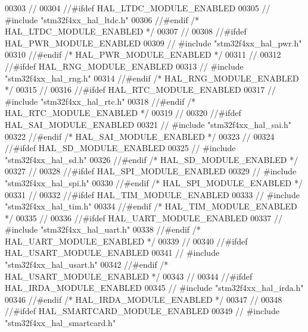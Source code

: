 \begin{DoxyCode}
00303 \textcolor{comment}{//}
00304 \textcolor{comment}{//#ifdef HAL\_LTDC\_MODULE\_ENABLED}
00305 \textcolor{comment}{// #include "stm32f4xx\_hal\_ltdc.h"}
00306 \textcolor{comment}{//#endif /* HAL\_LTDC\_MODULE\_ENABLED */}
00307 \textcolor{comment}{//}
00308 \textcolor{comment}{//#ifdef HAL\_PWR\_MODULE\_ENABLED}
00309 \textcolor{comment}{// #include "stm32f4xx\_hal\_pwr.h"}
00310 \textcolor{comment}{//#endif /* HAL\_PWR\_MODULE\_ENABLED */}
00311 \textcolor{comment}{//}
00312 \textcolor{comment}{//#ifdef HAL\_RNG\_MODULE\_ENABLED}
00313 \textcolor{comment}{// #include "stm32f4xx\_hal\_rng.h"}
00314 \textcolor{comment}{//#endif /* HAL\_RNG\_MODULE\_ENABLED */}
00315 \textcolor{comment}{//}
00316 \textcolor{comment}{//#ifdef HAL\_RTC\_MODULE\_ENABLED}
00317 \textcolor{comment}{// #include "stm32f4xx\_hal\_rtc.h"}
00318 \textcolor{comment}{//#endif /* HAL\_RTC\_MODULE\_ENABLED */}
00319 \textcolor{comment}{//}
00320 \textcolor{comment}{//#ifdef HAL\_SAI\_MODULE\_ENABLED}
00321 \textcolor{comment}{// #include "stm32f4xx\_hal\_sai.h"}
00322 \textcolor{comment}{//#endif /* HAL\_SAI\_MODULE\_ENABLED */}
00323 \textcolor{comment}{//}
00324 \textcolor{comment}{//#ifdef HAL\_SD\_MODULE\_ENABLED}
00325 \textcolor{comment}{// #include "stm32f4xx\_hal\_sd.h"}
00326 \textcolor{comment}{//#endif /* HAL\_SD\_MODULE\_ENABLED */}
00327 \textcolor{comment}{//}
00328 \textcolor{comment}{//#ifdef HAL\_SPI\_MODULE\_ENABLED}
00329 \textcolor{comment}{// #include "stm32f4xx\_hal\_spi.h"}
00330 \textcolor{comment}{//#endif /* HAL\_SPI\_MODULE\_ENABLED */}
00331 \textcolor{comment}{//}
00332 \textcolor{comment}{//#ifdef HAL\_TIM\_MODULE\_ENABLED}
00333 \textcolor{comment}{// #include "stm32f4xx\_hal\_tim.h"}
00334 \textcolor{comment}{//#endif /* HAL\_TIM\_MODULE\_ENABLED */}
00335 \textcolor{comment}{//}
00336 \textcolor{comment}{//#ifdef HAL\_UART\_MODULE\_ENABLED}
00337 \textcolor{comment}{// #include "stm32f4xx\_hal\_uart.h"}
00338 \textcolor{comment}{//#endif /* HAL\_UART\_MODULE\_ENABLED */}
00339 \textcolor{comment}{//}
00340 \textcolor{comment}{//#ifdef HAL\_USART\_MODULE\_ENABLED}
00341 \textcolor{comment}{// #include "stm32f4xx\_hal\_usart.h"}
00342 \textcolor{comment}{//#endif /* HAL\_USART\_MODULE\_ENABLED */}
00343 \textcolor{comment}{//}
00344 \textcolor{comment}{//#ifdef HAL\_IRDA\_MODULE\_ENABLED}
00345 \textcolor{comment}{// #include "stm32f4xx\_hal\_irda.h"}
00346 \textcolor{comment}{//#endif /* HAL\_IRDA\_MODULE\_ENABLED */}
00347 \textcolor{comment}{//}
00348 \textcolor{comment}{//#ifdef HAL\_SMARTCARD\_MODULE\_ENABLED}
00349 \textcolor{comment}{// #include "stm32f4xx\_hal\_smartcard.h"}

\end{DoxyCode}
